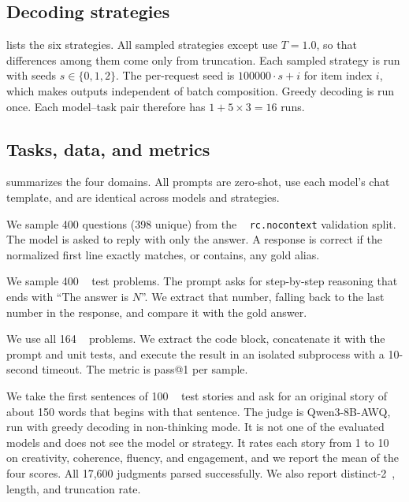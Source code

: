 \subsection{Decoding strategies}
 lists the six strategies. All sampled strategies except \tsev use $T{=}1.0$, so that differences among them come only from truncation. Each sampled strategy is run with seeds $s\in\{0,1,2\}$. The per-request seed is $100000\cdot s + i$ for item index $i$, which makes outputs independent of batch composition. Greedy decoding is run once. Each model--task pair therefore has $1 + 5\times 3 = 16$ runs.



\subsection{Tasks, data, and metrics}
 summarizes the four domains. All prompts are zero-shot, use each model's chat template, and are identical across models and strategies.

 We sample 400 questions (398 unique) from the \triviaqa~\citep{joshi2017triviaqa} \texttt{rc.nocontext} validation split. The model is asked to reply with only the answer. A response is correct if the normalized first line exactly matches, or contains, any gold alias.

 We sample 400 \gsm~\citep{cobbe2021gsm8k} test problems. The prompt asks for step-by-step reasoning that ends with ``The answer is $N$''. We extract that number, falling back to the last number in the response, and compare it with the gold answer.

 We use all 164 \humaneval~\citep{chen2021codex} problems. We extract the code block, concatenate it with the prompt and unit tests, and execute the result in an isolated subprocess with a 10-second timeout. The metric is pass@1 per sample.

 We take the first sentences of 100 \rocstories~\citep{mostafazadeh2016rocstories} test stories and ask for an original story of about 150 words that begins with that sentence. The judge is Qwen3-8B-AWQ, run with greedy decoding in non-thinking mode. It is not one of the evaluated models and does not see the model or strategy. It rates each story from 1 to 10 on creativity, coherence, fluency, and engagement, and we report the mean of the four scores. All 17{,}600 judgments parsed successfully. We also report distinct-2~\citep{li2016diversity}, length, and truncation rate.

